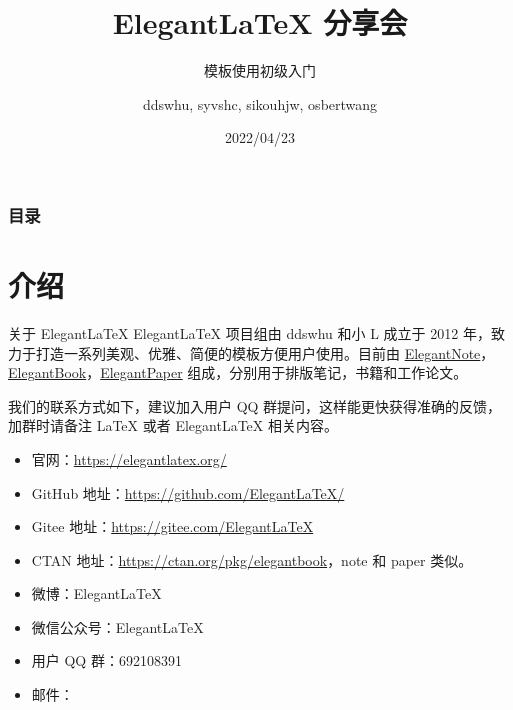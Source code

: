 \documentclass[9pt]{beamer}
\author{ddswhu, syvshc, sikouhjw, osbertwang}
\title{Elegant\LaTeX{} 分享会}
\subtitle{模板使用初级入门}
\institute{ElegantLaTeX Program}
\date{2022/04/23}
\begin{document}
\maketitle


\begin{frame}\frametitle{目录}
\tableofcontents
\end{frame}


\section{介绍}

\begin{frame}{关于 ElegantLaTeX}
Elegant\LaTeX{} 项目组由 \textcolor{iron}{ddswhu} 和\textcolor{iron}{小 L} 成立于 2012 年，致力于打造一系列美观、优雅、简便的模板方便用户使用。目前由 \href{https://github.com/ElegantLaTeX/ElegantNote}{ElegantNote}，\href{https://github.com/ElegantLaTeX/ElegantBook}{ElegantBook}，\href{https://github.com/ElegantLaTeX/ElegantPaper}{ElegantPaper} 组成，分别用于排版笔记，书籍和工作论文。

我们的联系方式如下，建议加入用户 QQ 群提问，这样能更快获得准确的反馈，加群时请备注 \LaTeX{} 或者 Elegant\LaTeX{} 相关内容。
\begin{itemize}
  \item 官网：\href{https://elegantlatex.org/}{https://elegantlatex.org/}
  \item GitHub 地址：\href{https://github.com/ElegantLaTeX/}{https://github.com/ElegantLaTeX/}
  \item Gitee 地址：\href{https://gitee.com/ElegantLaTeX}{https://gitee.com/ElegantLaTeX}
  \item CTAN 地址：\href{https://ctan.org/pkg/elegantbook}{https://ctan.org/pkg/elegantbook}，note 和 paper 类似。
  \item 微博：Elegant\LaTeX{}
  \item 微信公众号：Elegant\LaTeX{}
  \item 用户 QQ 群：692108391
  \item 邮件：
\end{itemize}
\end{frame}
\end{document}
